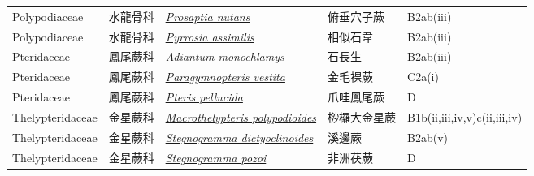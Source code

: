{\begin{longtable}{p{2.5cm}p{2.5cm}p{4.5cm}p{2.5cm}p{3cm}}
    Polypodiaceae & 水龍骨科 & \href{http://www.theplantlist.org/tpl1.1/search?q=Prosaptia+nutans}{\textit{Prosaptia nutans} } & 俯垂穴子蕨 & B2ab(iii) \index{Prosaptia@\textit{Prosaptia}!nutans@\textit{nutans}}  \index{俯垂穴子蕨} \\
    Polypodiaceae & 水龍骨科 & \href{http://www.theplantlist.org/tpl1.1/search?q=Pyrrosia+assimilis}{\textit{Pyrrosia assimilis} } & 相似石韋 & B2ab(iii) \index{Pyrrosia@\textit{Pyrrosia}!assimilis@\textit{assimilis}}  \index{相似石韋} \\
    Pteridaceae & 鳳尾蕨科 & \href{http://www.theplantlist.org/tpl1.1/search?q=Adiantum+monochlamys}{\textit{Adiantum monochlamys} } & 石長生 & B2ab(iii) \index{Adiantum@\textit{Adiantum}!monochlamys@\textit{monochlamys}}  \index{石長生} \\
    Pteridaceae & 鳳尾蕨科 & \href{http://www.theplantlist.org/tpl1.1/search?q=Paragymnopteris+vestita}{\textit{Paragymnopteris vestita} } & 金毛裸蕨 & C2a(i) \index{Paragymnopteris@\textit{Paragymnopteris}!vestita@\textit{vestita}}  \index{金毛裸蕨} \\
    Pteridaceae & 鳳尾蕨科 & \href{http://www.theplantlist.org/tpl1.1/search?q=Pteris+pellucida}{\textit{Pteris pellucida} } & 爪哇鳳尾蕨 & D \index{Pteris@\textit{Pteris}!pellucida@\textit{pellucida}}  \index{爪哇鳳尾蕨} \\
    Thelypteridaceae & 金星蕨科 & \href{http://www.theplantlist.org/tpl1.1/search?q=Macrothelypteris+polypodioides}{\textit{Macrothelypteris polypodioides} } & 桫欏大金星蕨 & B1b(ii,iii,iv,v)c(ii,iii,iv) \index{Macrothelypteris@\textit{Macrothelypteris}!polypodioides@\textit{polypodioides}}  \index{桫欏大金星蕨} \\
    Thelypteridaceae & 金星蕨科 & \href{http://www.theplantlist.org/tpl1.1/search?q=Stegnogramma+dictyoclinoides}{\textit{Stegnogramma dictyoclinoides} } & 溪邊蕨 & B2ab(v) \index{Stegnogramma@\textit{Stegnogramma}!dictyoclinoides@\textit{dictyoclinoides}}  \index{溪邊蕨} \\
    Thelypteridaceae & 金星蕨科 & \href{http://www.theplantlist.org/tpl1.1/search?q=Stegnogramma+pozoi}{\textit{Stegnogramma pozoi} } & 非洲茯蕨 & D \index{Stegnogramma@\textit{Stegnogramma}!pozoi@\textit{pozoi}}  \index{非洲茯蕨} \\
    \bottomrule
        \end{longtable}
        }
    